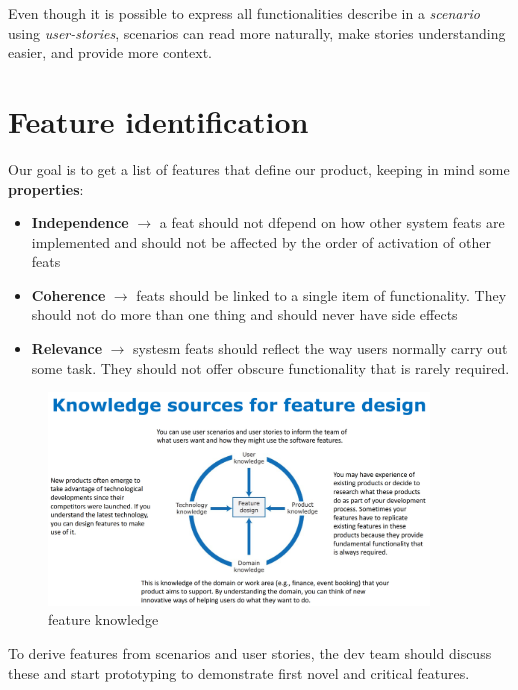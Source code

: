 Even though it is possible to express all functionalities describe in a \textit{scenario} using \textit{user-stories},
scenarios can read more naturally, make stories understanding easier, and provide more context.

\section{Feature identification}
Our goal is to get a list of features that define our product, keeping in mind some \textbf{properties}:
\begin{itemize}
    \item \textbf{Independence} $\rightarrow$ a feat should not dfepend on how other system feats are implemented and should not be affected by the order of activation of other feats
    \item \textbf{Coherence} $\rightarrow$ feats should be linked to a single item of functionality.
    They should not do more than one thing and should never have side effects
    \item \textbf{Relevance} $\rightarrow$ systesm feats should reflect the way users normally carry out some task.
    They should not offer obscure functionality that is rarely required.
\end{itemize}

\begin{figure}
    \centering
    \includegraphics[width=0.9\textwidth]{images/feature_design.png}
    \caption{feature knowledge}
    \label{fig:feature_knowledge}
\end{figure}

To derive features from scenarios and user stories, the dev team should discuss these and start prototyping to demonstrate first novel and critical features.

